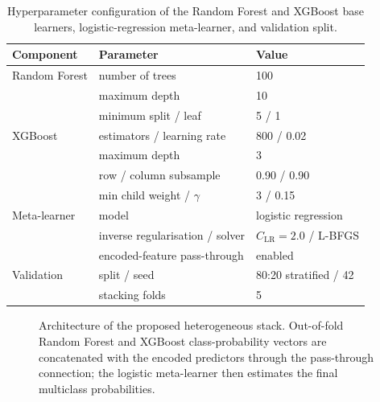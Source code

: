 ﻿\documentclass[preprint,12pt]{elsarticle}
\begin{document}
\begin{table}[H]
\centering
\caption{Hyperparameter configuration of the Random Forest and XGBoost base learners, logistic-regression meta-learner, and validation split.}
\label{tab:hyper}
\small
\begin{tabular}{lll}
\toprule
Component & Parameter & Value \\
\midrule
Random Forest & number of trees & 100 \\
 & maximum depth & 10 \\
 & minimum split / leaf & 5 / 1 \\
XGBoost & estimators / learning rate & 800 / 0.02 \\
 & maximum depth & 3 \\
 & row / column subsample & 0.90 / 0.90 \\
 & min child weight / $\gamma$ & 3 / 0.15 \\
Meta-learner & model & logistic regression \\
 & inverse regularisation / solver & $C_{\mathrm{LR}}=2.0$ / L-BFGS \\
 & encoded-feature pass-through & enabled \\
Validation & split / seed & 80:20 stratified / 42 \\
 & stacking folds & 5 \\
\bottomrule
\end{tabular}
\end{table}

\begin{figure}[H]
\centering
{}
\caption{Architecture of the proposed heterogeneous stack. Out-of-fold Random Forest and XGBoost class-probability vectors are concatenated with the encoded predictors through the pass-through connection; the logistic meta-learner then estimates the final multiclass probabilities.}
\label{fig:stack}
\end{figure}
\end{document}
